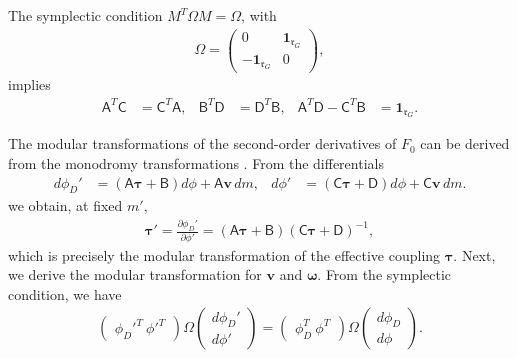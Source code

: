 \documentclass[11pt, a4paper]{article}
\theoremstyle{definition}
\begin{document}
The symplectic condition $M^T\Omega M=\Omega$, with
\begin{align}
    \Omega
    =
    \begin{pmatrix}
        0 & \mathbf{1}_{\mathfrak{r}_G}\\
        -\mathbf{1}_{\mathfrak{r}_G} & 0
    \end{pmatrix},
\end{align}
implies
\begin{align}\label{eq:Sprelations}
    \mathsf{A}^T\mathsf{C}
    &=
    \mathsf{C}^T\mathsf{A},
    &
    \mathsf{B}^T\mathsf{D}
    &=
    \mathsf{D}^T\mathsf{B},
    &
    \mathsf{A}^T\mathsf{D}
    -
    \mathsf{C}^T\mathsf{B}
    &=
    \mathbf{1}_{\mathfrak{r}_G}.
\end{align}

The modular transformations of the second-order derivatives of $F_0$ can be derived from the monodromy transformations \cite{deWit:1996gjy}. From the differentials
\begin{align}\label{eq:dphi}
    d\phi_D'
    &=
    (\mathsf{A}\boldsymbol\tau+\mathsf{B})d\phi+\mathsf{A}\boldsymbol v\,dm,
    &
    d\phi'
    &=
    (\mathsf{C}\boldsymbol\tau+\mathsf{D})d\phi+\mathsf{C}\boldsymbol v\,dm.
\end{align}
we obtain, at fixed $m'$, 
\begin{align}
    \boldsymbol\tau'=\frac{\partial \phi_D'}{\partial \phi'}=(\mathsf{A}\boldsymbol \tau+\mathsf{B})(\mathsf{C}\boldsymbol\tau+\mathsf{D})^{-1},
\end{align}
which is precisely the modular transformation of the effective coupling $\boldsymbol \tau $. Next, we derive the modular transformation for $\boldsymbol v$ and $\boldsymbol \omega$. From the symplectic condition, we have
\begin{align}\label{eq:symplecticrelations}
   \begin{pmatrix}
        \phi_D'^T\ 
        \phi'^T
    \end{pmatrix}\Omega \begin{pmatrix}
        d\phi_D'\\
       d \phi'
    \end{pmatrix}=\begin{pmatrix}
        \phi_D^T\ 
        \phi^T
    \end{pmatrix}\Omega \begin{pmatrix}
        d\phi_D\\
       d \phi
    \end{pmatrix}.
\end{align}
\end{document}

